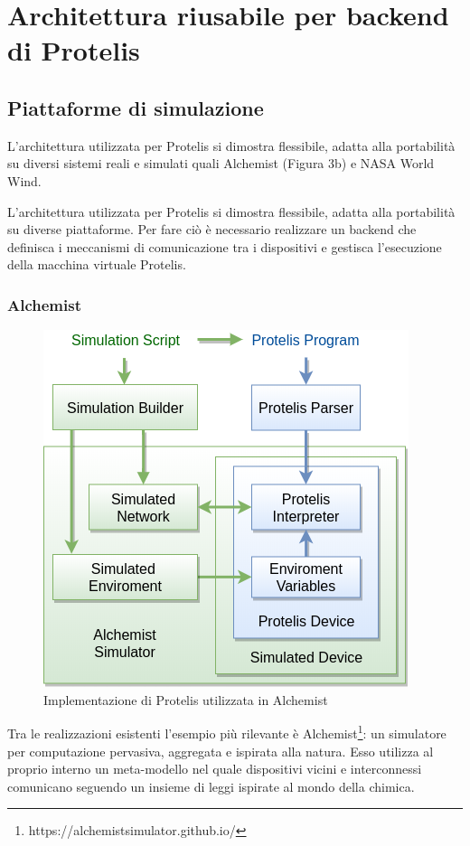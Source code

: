 \chapter{Architettura riusabile per backend di Protelis}
\section{Piattaforme di simulazione}
L'architettura utilizzata per Protelis si dimostra flessibile, adatta alla
portabilità su diversi sistemi reali\cite{Clark2015} e simulati quali
Alchemist\cite{alchemist} (Figura 3b) e NASA World Wind\cite{Bell2007}.

L'architettura utilizzata per Protelis si dimostra flessibile, adatta alla
portabilità su diverse piattaforme. Per fare ciò è necessario realizzare un
backend che definisca i meccanismi di comunicazione tra i dispositivi e
gestisca l'esecuzione della macchina virtuale Protelis.

\subsection{Alchemist}
\begin{figure}
  \centering
  \includegraphics[width=0.7\linewidth]{media/alchemist-architecture.png}
  \caption{Implementazione di Protelis utilizzata in Alchemist}
\end{figure}
Tra le realizzazioni esistenti l'esempio più rilevante è
Alchemist\footnote{https://alchemistsimulator.github.io/}: un simulatore per
computazione pervasiva, aggregata e ispirata alla natura. Esso utilizza al
proprio interno un meta-modello nel quale dispositivi vicini e interconnessi
comunicano seguendo un insieme di leggi ispirate al mondo della chimica.

